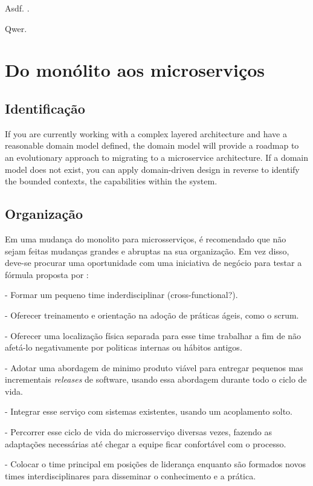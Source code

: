Asdf. \cite{oracle_microservices}.

Qwer. \cite{12factor}

\section{Do monólito aos microserviços}

\subsection{Identificação}

If you are currently working with a complex layered architecture and have a reasonable domain model defined, the domain model will provide a roadmap to an evolutionary approach to migrating to a microservice architecture. If a domain model does not exist, you can apply domain-driven design in reverse to identify the bounded contexts, the capabilities within the system. \cite{Familiar2015}


\subsection{Organização}

Em uma mudança do monolito para microsserviços, é recomendado que não sejam feitas mudanças grandes e abruptas na sua organização. Em vez disso, deve-se procurar uma oportunidade com uma iniciativa de negócio para testar a fórmula proposta por  : 

- Formar um pequeno time inderdisciplinar (cross-functional?).

- Oferecer treinamento e orientação na adoção de práticas ágeis, como o scrum.

- Oferecer uma localização física separada para esse time trabalhar a fim de não afetá-lo negativamente por politicas internas ou hábitos antigos.

- Adotar uma abordagem de minimo produto viável para entregar pequenos mas incrementais \emph{releases} de software, usando essa abordagem durante todo o ciclo de vida.

- Integrar esse serviço com sistemas existentes, usando um acoplamento solto.

- Percorrer esse ciclo de vida do microsserviço diversas vezes, fazendo as adaptações necessárias até chegar a equipe ficar confortável com o processo.

- Colocar o time principal em posições de liderança enquanto são formados novos times interdisciplinares para disseminar o conhecimento e a prática.